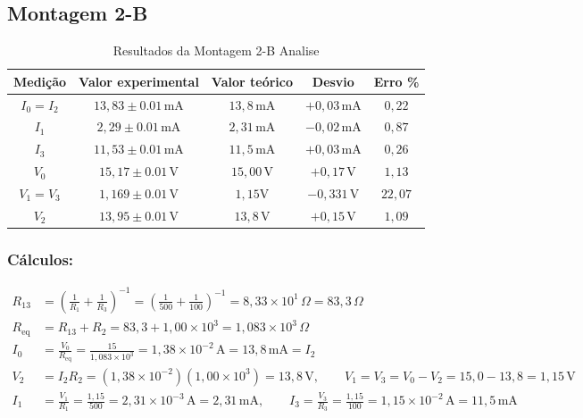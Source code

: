 \subsection{Montagem 2-B}

\begin{table}[H]
	\centering
	\caption{Resultados da Montagem 2-B Analise}
	\begin{tabular}{|c|c|c|c|c|}
		\hline
		\textbf{Medição} & \textbf{Valor experimental}   & \textbf{Valor teórico} & \textbf{Desvio} & \textbf{Erro \%} \\
		\hline
		$I_0 = I_2$            & $ 13,83\pm 0.01 \, \text{mA}$ & $ 13,8 \, \text{mA}$  & $+0,03$\,mA     & $0,22$           \\
		\hline
		$I_1$            & $ 2,29\pm 0.01\, \text{mA}$  & $ 2,31 \, \text{mA}$  & $-0,02$\,mA     & $0,87$           \\
		\hline
		$I_3$            & $ 11,53\pm 0.01\, \text{mA}$  & $ 11,5 \, \text{mA}$  & $+0,03$\,mA     & $0,26$           \\
		\hline
		$V_0$            & $15,17 \pm 0.01\, \text{V}$   & $ 15,00 \, \text{V}$   & $+0,17$\,V      & $1,13$           \\
		\hline
		$V_1 = V_3 $            & $1,169\pm 0.01\, \text{V}$    & $ 1,15 \text{V}$    & $-0,331$\,V      & $22,07$           \\
		\hline
		$V_2$            & $13,95\pm 0.01\, \text{V}$    & $ 13,8 \, \text{V}$    & $+0,15$\,V      & $1,09 $          \\
		\hline
	\end{tabular}
\end{table}

\subsubsection{Cálculos:}
\[
\begin{aligned}
R_{13}&=\left(\frac{1}{R_1}+\frac{1}{R_3}\right)^{-1}
=\left(\frac{1}{500}+\frac{1}{100}\right)^{-1}
=8,33\times10^{1}\,\Omega=83,3\,\Omega \\
R_{\mathrm{eq}}&=R_{13}+R_2=83,3+1,00\times10^{3}
=1,083\times10^{3}\,\Omega \\
I_0&=\frac{V_0}{R_{\mathrm{eq}}}
=\frac{15}{1,083\times10^{3}}
=1,38\times10^{-2}\,\mathrm{A}=13,8\,\mathrm{mA}=I_2 \\
V_2&=I_2R_2=(1,38\times10^{-2})(1,00\times10^{3})
=13,8\,\mathrm{V}, \qquad
V_1=V_3=V_0-V_2=15,0-13,8=1,15\,\mathrm{V} \\
I_1&=\frac{V_1}{R_1}=\frac{1,15}{500}
=2,31\times10^{-3}\,\mathrm{A}=2,31\,\mathrm{mA}, \qquad
I_3=\frac{V_3}{R_3}=\frac{1,15}{100}
=1,15\times10^{-2}\,\mathrm{A}=11,5\,\mathrm{mA}
\end{aligned}
\]

